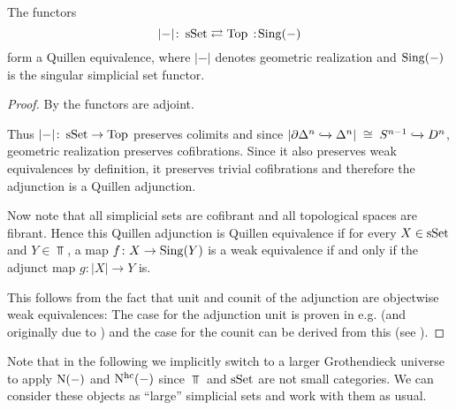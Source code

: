 \begin{thm}\label{prop:quillenEqSSetTop}
    The functors
    \begin{equation*}
        \lvert-\rvert\colon\sSet\rightleftarrows\Top\mkern+3mu:\mkern-3mu\Sing(-)
    \end{equation*}
    form a Quillen equivalence, where $\lvert-\rvert$ denotes geometric realization and $\operatorname{Sing}(-)$ is the singular simplicial set functor.
    \begin{proof}
        By \cite[Corollary 1.1.8.5]{kerodon} the functors are adjoint.

        Thus $\lvert-\rvert\colon\operatorname{sSet}\to\operatorname{Top}$ preserves colimits and since $\lvert\partial\Delta^n\xhookrightarrow{}\Delta^n\rvert\;\cong\;S^{n-1}\xhookrightarrow{} D^n$, geometric realization preserves cofibrations.
        Since it also preserves weak equivalences by definition, it preserves trivial cofibrations and therefore the adjunction is a Quillen adjunction.

        Now note that all simplicial sets are cofibrant and all topological spaces are fibrant.
        Hence this Quillen adjunction is Quillen equivalence if for every $X\in\operatorname{sSet}$ and $Y\in\Top$, a map $f\colon X\to\operatorname{Sing}(Y)$ is a weak equivalence if and only if the adjunct map $g\colon\lvert X\rvert\to Y$ is.
        
        This follows from the fact that unit and counit of the adjunction are objectwise weak equivalences:
        The case for the adjunction unit is proven in e.g. \cite[Theorem 3.5.4.1]{kerodon} (and originally due to \cite{milnor_unit_we}) and the case for the counit can be derived from this (see \cite[Corollary 3.5.4.2]{kerodon}).
    \end{proof}
\end{thm}
\begin{remark}
    Note that in the following we implicitly switch to a larger Grothendieck universe to apply $\operatorname{N}(-)$ and $\operatorname{N^{hc}}(-)$ since $\Top$ and $\operatorname{sSet}$ are not small categories.
    We can consider these objects as ``large'' simplicial sets and work with them as usual.
\end{remark}
